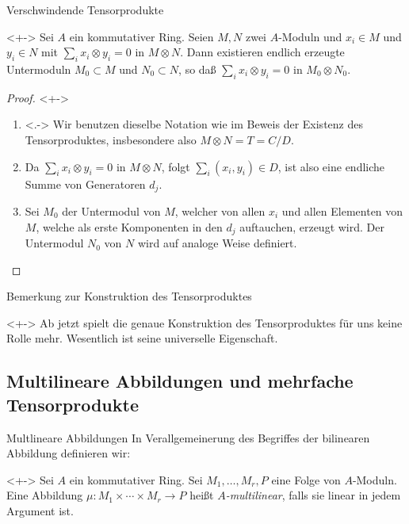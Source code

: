 \begin{frame}{Verschwindende Tensorprodukte}
	\begin{corollary}<+->
		Sei \(A\) ein kommutativer Ring. Seien \(M, N\) zwei \(A\)-Moduln und \(x_i \in M\) und
		\(y_i \in N\) mit \(\sum\limits_{i} x_i \otimes y_i = 0\) in \(M \otimes N\). Dann existieren endlich
		erzeugte Untermoduln \(M_0 \subset M\) und \(N_0 \subset N\), so daß
		\(\sum\limits_{i} x_i \otimes y_i = 0\) in \(M_0 \otimes N_0\).
	\end{corollary}
	\begin{proof}<+->
		\begin{enumerate}[<+->]
		\item<.->
			Wir benutzen dieselbe Notation wie im Beweis der Existenz des Tensorproduktes, insbesondere also
			\(M \otimes N = T = C/D\).
		\item
			Da \(\sum\limits_{i} x_i \otimes y_i = 0\) in \(M \otimes N\), folgt
			\(\sum\limits_{i} (x_i, y_i) \in D\), ist also eine endliche Summe von Generatoren \(d_j\).
		\item
			Sei \(M_0\) der Untermodul von \(M\), welcher von allen \(x_i\) und allen Elementen von \(M\),
			welche als
			erste Komponenten in den \(d_j\) auftauchen, erzeugt wird.
			Der Untermodul \(N_0\) von \(N\) wird auf analoge Weise definiert.
			\qedhere
		\end{enumerate}
	\end{proof}
\end{frame}

\begin{frame}{Bemerkung zur Konstruktion des Tensorproduktes}
	\begin{remark}<+->
		Ab jetzt spielt die genaue Konstruktion des Tensorproduktes für uns keine Rolle mehr. Wesentlich
		ist seine universelle Eigenschaft.
	\end{remark}
\end{frame}

\subsection{Multilineare Abbildungen und mehrfache Tensorprodukte}

\begin{frame}{Multlineare Abbildungen}
	In Verallgemeinerung des Begriffes der bilinearen Abbildung definieren wir:
	\begin{definition}<+->
		Sei \(A\) ein kommutativer Ring. Sei \(M_1, \dotsc, M_r, P\) eine Folge von \(A\)-Moduln.
		\\
		Eine Abbildung \(\mu\colon M_1 \times \dotsb \times M_r \to P\) heißt \emph{\(A\)-multilinear}, falls
		sie linear in jedem Argument ist.
	\end{definition}
\end{frame}

